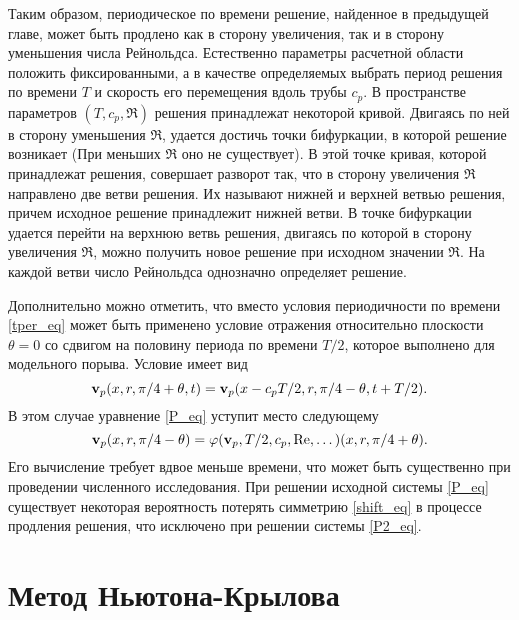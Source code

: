 Таким образом, периодическое по времени решение, найденное в предыдущей главе, может быть продлено как в сторону увеличения, так и в сторону уменьшения числа Рейнольдса. Естественно параметры расчетной области положить фиксированными, а в качестве определяемых выбрать период решения по времени $T$ и скорость его перемещения вдоль трубы $c_p$. В пространстве параметров $(T, c_p, \Re)$ решения принадлежат некоторой кривой. Двигаясь по ней в сторону уменьшения $\Re$, удается достичь точки бифуркации, в которой решение возникает (При меньших $\Re$ оно не существует). В этой точке кривая, которой принадлежат решения, совершает разворот так, что в сторону увеличения $\Re$ направлено две ветви решения. Их называют нижней и верхней ветвью решения, причем исходное решение принадлежит нижней ветви. В точке бифуркации удается перейти на верхнюю ветвь решения, двигаясь по которой в сторону увеличения $\Re$, можно получить новое решение при исходном значении $\Re$. На каждой ветви число Рейнольдса однозначно определяет решение. 

Дополнительно можно отметить, что вместо условия периодичности по времени \eqref{tper_eq} может быть применено условие отражения относительно плоскости $\theta = 0$ со сдвигом на половину периода по времени $T/2$, которое выполнено для модельного порыва. Условие имеет вид
\begin{equation}\label{shift_eq}
\mathbf{v}_p(x,r,\pi/4 + \theta,t) = \mathbf{v}_p(x - c_p T/2,r,\pi/4 - \theta,t+T/2).
\end{equation}
В этом случае уравнение \eqref{P_eq} уступит место следующему
\begin{equation}\label{P2_eq}
\mathbf{v}_p(x,r,\pi/4 - \theta) = \varphi(\mathbf{v}_p, T/2, c_p, \operatorname{Re}, \dots)(x,r,\pi/4 + \theta).
\end{equation}
Его вычисление требует вдвое меньше времени, что может быть существенно при проведении численного исследования. При решении исходной системы \eqref{P_eq} существует некоторая вероятность потерять симметрию \eqref{shift_eq} в процессе продления решения, что исключено при решении системы \eqref{P2_eq}.


\section{Метод Ньютона-Крылова}

